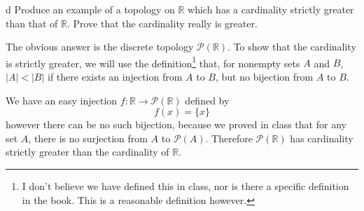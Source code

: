 \documentclass[11pt]{article}
\begin{document}
\begin{p}{d}
  Produce an example of a topology on $\mathbb{R}$ which has a cardinality
  strictly greater than that of $\mathbb{R}$. Prove that the cardinality really is
  greater.
\end{p}

\begin{solution}
  The obvious answer is the discrete topology $\mathcal{P}(\mathbb{R}).$ To show
  that the cardinality is strictly greater, we will use the
  definition\footnote{I don't believe we have defined this in class, nor is
  there a specific definition in the book. This is a reasonable definition however.}
  that, for nonempty sets $A$ and $B$, $|A| < |B|$ if there exists an injection
  from $A$ to $B$, but no bijection from $A$ to $B$.

  We have an easy injection $f: \mathbb{R} \to \mathcal{P}(\mathbb{R})$ defined
  by
  \[ f(x) = \{x\} \]
  however there can be no such bijection, because we proved in class that for
  any set $A$, there is no surjection from $A$ to $\mathcal{P}(A)$. Therefore
  $\mathcal{P}(\mathbb{R})$ has cardinality strictly greater than the
  cardinality of $\mathbb{R}$.
\end{solution}
\end{document}
